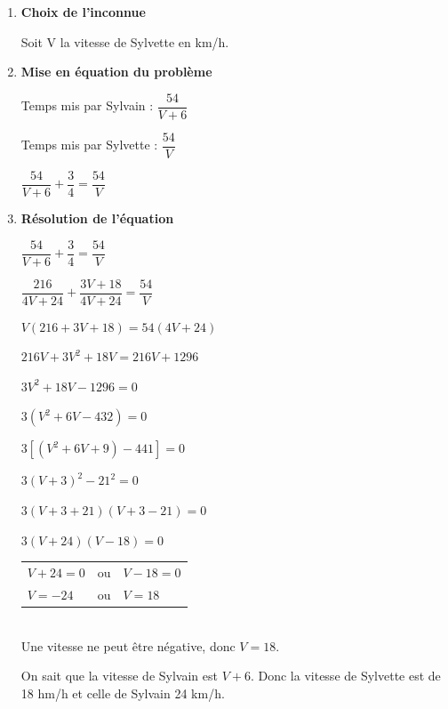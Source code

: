 \begin{enumerate}
\item \textbf{Choix de l'inconnue}

Soit V la vitesse de Sylvette en km/h.

\item \textbf{Mise en équation du problème}

Temps mis par Sylvain : $\dfrac{54}{V+6}$

Temps mis par Sylvette : $\dfrac{54}{V}$

$\dfrac{54}{V+6} + \dfrac{3}{4} = \dfrac{54}{V}$

\item \textbf{Résolution de l'équation}

$\dfrac{54}{V+6} + \dfrac{3}{4} = \dfrac{54}{V}$

$\dfrac{216}{4V+24} + \dfrac{3V+18}{4V+24} = \dfrac{54}{V}$

$V\left(216+3V+18\right)=54\left(4V+24\right) $

$ 216V + 3V^2 + 18V = 216V + 1296 $

$ 3V^2 + 18V -1296 = 0 $

$ 3\left(V^2 + 6V - 432\right)=0 $

$ 3\left[\left(V^2 + 6V +9\right) - 441\right] = 0 $

$ 3\left(V+3\right)^2 - 21^2 = 0 $

$ 3\left(V + 3 + 21 \right)\left(V+3-21\right)=0 $

$ 3\left(V+24\right)\left(V-18\right) = 0 $ \\

\begin{tabular}{lcl}
$V+24 = 0$ & ou &$V-18=0$\\
$V=-24$ & ou &$V=18$\\
\end{tabular} \\

Une vitesse ne peut être négative, donc $V=18$.

On sait que la vitesse de Sylvain est $V+6$. Donc la vitesse de Sylvette est de 18 hm/h et celle de Sylvain 24 km/h.
\end{enumerate}



